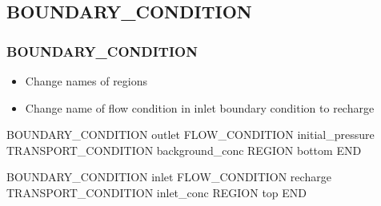 \documentclass{beamer}
\newcommand\redcomment[1]{{{\color{red} #1}}}
\newcommand\greencomment[1]{{{\color{green} #1}}}
\newcommand\magentacomment[1]{{{\color{magenta} #1}}}
\begin{document}
\subsection{BOUNDARY\_CONDITION}

\begin{frame}[fragile]\frametitle{BOUNDARY\_CONDITION}

\begin{itemize}
\item Change names of regions
\item Change name of flow condition in \redcomment{inlet} boundary condition to \greencomment{recharge}
\end{itemize}

\begin{semiverbatim}

BOUNDARY_CONDITION outlet
  FLOW_CONDITION initial_pressure
  TRANSPORT_CONDITION background_conc
  REGION \magentacomment{bottom}
END

BOUNDARY_CONDITION inlet
  FLOW_CONDITION \magentacomment{recharge}
  TRANSPORT_CONDITION inlet_conc
  REGION \magentacomment{top}
END
\end{semiverbatim}

\end{frame}
\end{document}
